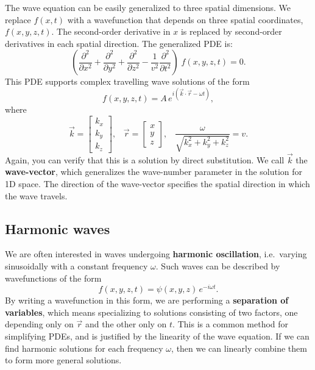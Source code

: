 \documentclass[10pt,a4paper]{article}
\begin{document}
The wave equation can be easily generalized to three spatial
dimensions.  We replace $f(x,t)$ with a wavefunction that depends on
three spatial coordinates, $f(x,y,z,t)$. The second-order derivative
in $x$ is replaced by second-order derivatives in each spatial
direction. The generalized PDE is:
\begin{equation}
\left(\frac{\partial^2}{\partial x^2} + \frac{\partial^2}{\partial y^2} + \frac{\partial^2}{\partial z^2} - \frac{1}{v^2} \frac{\partial^2}{\partial t^2}\right) \; f(x,y,z,t) = 0.
\label{wave3d}
\end{equation}
This PDE supports complex travelling wave solutions of the form
\begin{equation}
f(x,y,z,t) = A \, e^{i(\vec{k} \cdot \vec{r} - \omega t)},
\end{equation}
where
\begin{equation}
\vec{k} = \begin{bmatrix}k_x\\k_y\\k_z\end{bmatrix}, \;\;\; \vec{r} = \begin{bmatrix}x\\y\\z\end{bmatrix}, \;\;\;\frac{\omega}{\sqrt{k_x^2 + k_y^2 + k_z^2}} = v.
\end{equation}
Again, you can verify that this is a solution by direct substitution. We
call $\vec{k}$ the \textbf{wave-vector}, which generalizes the
wave-number parameter in the solution for 1D space. The direction of the
wave-vector specifies the spatial direction in which the wave travels.

\subsection{Harmonic waves}
\label{harmonic-waves}

We are often interested in waves undergoing \textbf{harmonic
  oscillation}, i.e.~varying sinusoidally with a constant frequency
$\omega$. Such waves can be described by wavefunctions of the form
\begin{equation}
f(x,y,z,t) = \psi(x,y,z) \, e^{-i\omega t}.
\end{equation}
By writing a wavefunction in this form, we are performing a
\textbf{separation of variables}, which means specializing to
solutions consisting of two factors, one depending only on $\vec{r}$
and the other only on $t$. This is a common method for simplifying
PDEs, and is justified by the linearity of the wave equation. If we
can find harmonic solutions for each frequency $\omega$, then we can
linearly combine them to form more general solutions.
\end{document}
